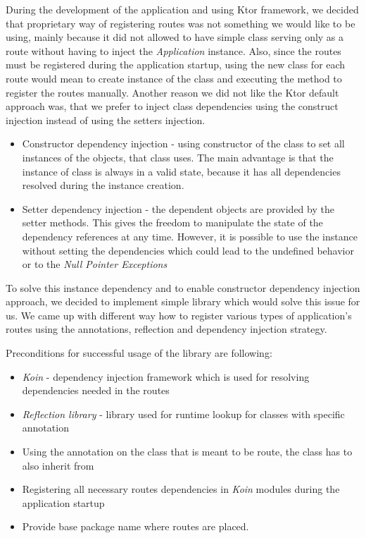 During the development of the application and using Ktor framework, 
we decided that proprietary way of registering routes was not something we would like to be using,
mainly because it did not allowed to have simple class serving only as a route without having to inject the \textit{Application} instance.
Also, 
since the routes must be registered during the application startup,
using the new class for each route would mean to create instance of the class and executing the method to register the routes manually.
Another reason we did not like the Ktor default approach was,
that we prefer to inject class dependencies using the construct injection instead of using the setters injection.
\begin{itemize}
	\item Constructor dependency injection - using constructor of the class to set all instances of the objects, that class uses.
	      The main advantage is that the instance of class is always in a valid state, because it has all dependencies resolved during the instance creation.
	\item Setter dependency injection - the dependent objects are provided by the setter methods.
	      This gives the freedom to manipulate the state of the dependency references at any time.
	      However, it is possible to use the instance without setting the dependencies which could lead to the undefined behavior or to the \textit{Null Pointer Exceptions}
\end{itemize}

To solve this  instance dependency and to enable constructor dependency injection approach,
we decided to implement simple library which would solve this issue for us.
We came up with different way how to register various types of application's routes using the annotations, 
reflection and dependency injection strategy.

\medskip \noindent
Preconditions for successful usage of the library are following:
\begin{itemize}
	\item \textit{Koin}\cite{koinGithub} - dependency injection framework which is used for resolving dependencies needed in the routes
	\item \textit{Reflection library}\cite{reflectionsGithub} - library used for runtime lookup for classes with specific annotation
	\item Using the  annotation on the class that is meant to be route,
	the class has to also inherit from 
	\item Registering all necessary routes dependencies in \textit{Koin} modules during the application startup
	\item Provide base package name where routes are placed.
\end{itemize}


